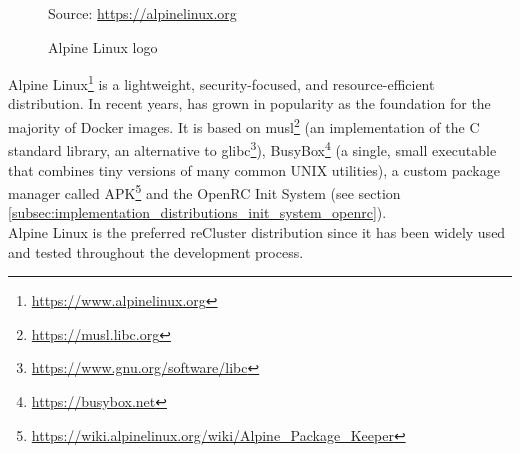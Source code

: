 \begin{figure} %
  \centering
  \def\stackalignment{r} %
  {\scriptsize \parbox[t]{\linewidth}{ Source: \url{https://alpinelinux.org}} }
  \caption{Alpine Linux logo}
\end{figure}

Alpine Linux\footnote{\url{https://www.alpinelinux.org}} is a lightweight,
security-focused, and resource-efficient distribution. In recent years, has grown
in popularity as the foundation for the majority of Docker images. It is based
on musl\footnote{\url{https://musl.libc.org}} (an implementation of the C standard
library, an alternative to glibc\footnote{\url{https://www.gnu.org/software/libc}}),
BusyBox\footnote{\url{https://busybox.net}} (a single, small executable that
combines tiny versions of many common UNIX utilities), a custom package manager
called APK\footnote{\url{https://wiki.alpinelinux.org/wiki/Alpine_Package_Keeper}}
and the OpenRC Init System (see section \ref{subsec:implementation_distributions_init_system_openrc})\cite{alpine_linux}.
\\ %
Alpine Linux is the preferred reCluster distribution since it has been widely used
and tested throughout the development process.

